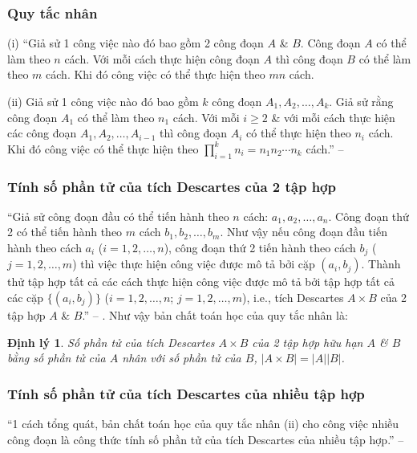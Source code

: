 \documentclass[oneside]{book}
\numberwithin{equation}{section}
\newtheorem{dinhly}{Định lý}[section]
\begin{document}
\subsubsection{Quy tắc nhân}
\begin{enumerate*}
	\item[(i)] ``Giả sử 1 công việc nào đó bao gồm 2 công đoạn $A$ \& $B$. Công đoạn $A$ có thể làm theo $n$ cách. Với mỗi cách thực hiện công đoạn $A$ thì công đoạn $B$ có thể làm theo $m$ cách. Khi đó công việc có thể thực hiện theo $mn$ cách.
	\item[(ii)] Giả sử 1 công việc nào đó bao gồm $k$ công đoạn $A_1,A_2,\ldots,A_k$. Giả sử rằng công đoạn $A_1$ có thể làm theo $n_1$ cách. Với mỗi $i\ge 2$ \& với mỗi cách thực hiện các công đoạn $A_1,A_2,\ldots,A_{i-1}$ thì công đoạn $A_i$ có thể thực hiện theo $n_i$ cách. Khi đó công việc có thể thực hiện theo $\prod_{i=1}^k n_i = n_1n_2\cdots n_k$ cách.'' -- \cite[p. 82]{TL_chuyen_Toan_Dai_So_Giai_Tich_11}
\end{enumerate*}

\subsubsection{Tính số phần tử của tích Descartes của 2 tập hợp}
``Giả sử công đoạn đầu có thể tiến hành theo $n$ cách: $a_1,a_2,\ldots,a_n$. Công đoạn thứ 2 có thể tiến hành theo $m$ cách $b_1,b_2,\ldots,b_m$. Như vậy nếu công đoạn đầu tiến hành theo cách $a_i$ ($i = 1,2,\ldots,n$), công đoạn thứ 2 tiến hành theo cách $b_j$ ($j = 1,2,\ldots,m$) thì việc thực hiện công việc được mô tả bởi cặp $(a_i,b_j)$. Thành thử tập hợp tất cả các cách thực hiện công việc được mô tả bởi tập hợp tất cả các cặp $\{(a_i,b_j)\}$  ($i = 1,2,\ldots,n$; $j = 1,2,\ldots,m$), i.e., tích Descartes $A\times B$ của 2 tập hợp $A$ \& $B$.'' -- \cite[p. 82]{TL_chuyen_Toan_Dai_So_Giai_Tich_11}. Như vậy bản chất toán học của quy tắc nhân là:

\begin{dinhly}
	Số phần tử của tích Descartes $A\times B$ của 2 tập hợp hữu hạn $A$ \& $B$ bằng số phần tử của $A$ nhân với số phần tử của $B$, $|A\times B| = |A||B|$.
\end{dinhly}

\subsubsection{Tính số phần tử của tích Descartes của nhiều tập hợp}
``1 cách tổng quát, bản chất toán học của quy tắc nhân (ii) cho công việc nhiều công đoạn là công thức tính số phần tử của tích Descartes của nhiều tập hợp.'' -- \cite[p. 82]{TL_chuyen_Toan_Dai_So_Giai_Tich_11}
\end{document}
